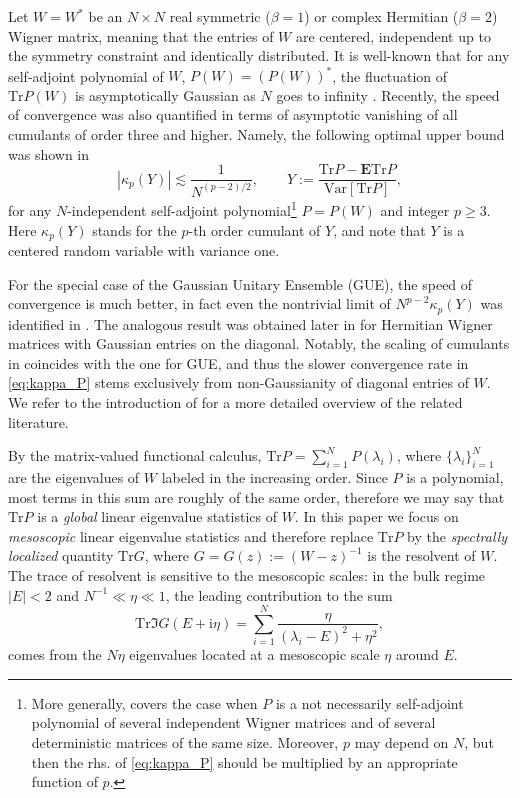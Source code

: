 \documentclass[10pt]{amsart}
\numberwithin{equation}{section}
\newcommand{\E}{\mathbf{E}}
\newcommand{\Var}{\mathrm{Var}}
\newcommand{\Tr}{\mathrm{Tr}}
\newcommand{\ii}{\mathrm{i}}
\begin{document}
Let $W=W^*$ be an $N\times N$ real symmetric ($\beta=1$) or complex Hermitian ($\beta=2$) Wigner matrix, meaning that the entries of $W$ are centered, independent up to the symmetry constraint and identically distributed. It is well-known that for any self-adjoint polynomial of $W$,  $P(W)=(P(W))^*$, the fluctuation of $\Tr P(W)$ is asymptotically Gaussian as $N$ goes to infinity \cite{Male2022, Belinschi2025}. Recently, the  speed of convergence was also quantified
in terms of asymptotic vanishing of all  cumulants of order three and higher.
 Namely, the following optimal upper bound was shown in~\cite[Theorem~1.6]{Ultra_high_cumulants}
\begin{equation}
\left\vert\kappa_p \left(Y\right)\right\vert\lesssim 
\frac{1}{N^{(p-2)/2}},\qquad Y:=\frac{\Tr P-\E \Tr P}{\Var[\Tr P]},
\label{eq:kappa_P}
\end{equation}
for any $N$-independent self-adjoint polynomial\footnote{More generally, \cite{Ultra_high_cumulants} covers the case when $P$ is a not necessarily self-adjoint polynomial of several independent Wigner matrices and of several deterministic matrices of the same size. Moreover, $p$ may depend on $N$, but then the rhs. of \eqref{eq:kappa_P} should be multiplied by an appropriate function of $p$.} $P=P(W)$ and integer $p\ge 3$. Here $\kappa_p(Y)$ stands for the $p$-th order cumulant of $Y$, and note that $Y$ is a centered random variable with variance one.


For the special case of the Gaussian Unitary Ensemble (GUE), the speed of convergence is much better, in fact even the nontrivial limit of $N^{p-2}\kappa_p(Y)$ was  identified in \cite{2nd_order_freeness_2006}. The analogous result was obtained later in \cite{cumulant_asymptotic_2024} for Hermitian Wigner matrices with Gaussian entries on the diagonal. Notably, the scaling of cumulants in \cite{cumulant_asymptotic_2024} coincides with the one for GUE, and thus the slower convergence rate in \eqref{eq:kappa_P} stems exclusively from non-Gaussianity of diagonal entries of $W$. We refer to the introduction of \cite{Ultra_high_cumulants} for a more detailed overview of the related literature. 


By the matrix-valued functional calculus, $\mathrm{Tr} P = \sum_{i=1}^N P(\lambda_i)$, where $\{\lambda_i\}_{i=1}^N$ are the eigenvalues of $W$ labeled in the increasing order. Since $P$ is a polynomial, most terms in this sum are roughly of the same order, therefore  we may say that $\mathrm{Tr} P$ is a \emph{global} linear eigenvalue statistics of $W$. In this paper we focus on  \emph{mesoscopic} linear eigenvalue statistics and therefore replace $\Tr P$ by the \emph{spectrally localized} quantity $\Tr G$, where $G=G(z):=(W-z)^{-1}$ is the resolvent of $W$. The trace of resolvent is sensitive to the mesoscopic scales: in the bulk regime $|E|<2$ and $N^{-1}\ll \eta\ll 1$, the leading contribution to the sum
\begin{equation}
\Tr\Im G(E+\ii\eta) = \sum_{i=1}^N \frac{\eta}{(\lambda_i-E)^2+\eta^2},
\label{eq:Tr_Im_G}
\end{equation}
comes from the $N\eta$ eigenvalues located at a mesoscopic scale $\eta$ around $E$.
\end{document}
